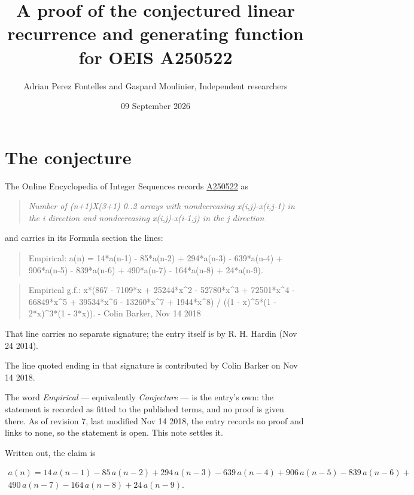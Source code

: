 \documentclass[11pt]{article}
\title{A proof of the conjectured linear recurrence and generating function for OEIS A250522}
\author{Adrian Perez Fontelles and Gaspard Moulinier, Independent researchers}
\date{09 September 2026}
\theoremstyle{definition}
\begin{document}
\maketitle
\section{The conjecture}

The Online Encyclopedia of Integer Sequences records \href{https://oeis.org/A250522}{A250522} as

\begin{quote}\itshape Number of (n+1)X(3+1) 0..2 arrays with nondecreasing x(i,j)-x(i,j-1) in the i direction and nondecreasing x(i,j)-x(i-1,j) in the j direction\end{quote}

and carries in its Formula section the lines:

\begin{quote}\ttfamily Empirical: a(n) = 14*a(n-1) - 85*a(n-2) + 294*a(n-3) - 639*a(n-4) + 906*a(n-5) - 839*a(n-6) + 490*a(n-7) - 164*a(n-8) + 24*a(n-9).\end{quote}

\begin{quote}\ttfamily Empirical g.f.: x*(867 - 7109*x + 25244*x\textasciicircum{}2 - 52780*x\textasciicircum{}3 + 72501*x\textasciicircum{}4 - 66849*x\textasciicircum{}5 + 39534*x\textasciicircum{}6 - 13260*x\textasciicircum{}7 + 1944*x\textasciicircum{}8) / ((1 - x)\textasciicircum{}5*(1 - 2*x)\textasciicircum{}3*(1 - 3*x)). - Colin Barker, Nov 14 2018\end{quote}

That line carries no separate signature; the entry itself is by R. H. Hardin (Nov 24 2014).

The line quoted ending in that signature is contributed by Colin Barker on Nov 14 2018.

The word {\itshape Empirical} --- equivalently {\itshape Conjecture} --- is the entry's own: the statement is recorded as fitted to the published terms, and no proof is given there. As of revision 7, last modified Nov 14 2018, the entry records no proof and links to none, so the statement is open. This note settles it.

Written out, the claim is

\begin{multline*} a(n) = 14\,a(n-1) - 85\,a(n-2) + 294\,a(n-3) - 639\,a(n-4) + 906\,a(n-5) - 839\,a(n-6) + \\ 490\,a(n-7) - 164\,a(n-8) + 24\,a(n-9). \end{multline*}
\end{document}
